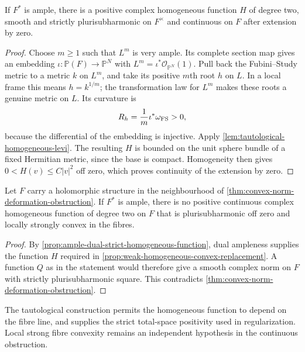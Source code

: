 \begin{proposition}\label{prop:ample-dual-strict-homogeneous-function}
If $F^*$ is ample, there is a positive complex homogeneous function $H$ of degree two, smooth and strictly plurisubharmonic on $F^\times$ and continuous on $F$ after extension by zero.
\end{proposition}
\begin{proof}
Choose $m\geq1$ such that $L^m$ is very ample. Its complete section map gives an embedding $\iota:\mathbb P(F)\to\mathbb P^N$ with $L^m=\iota^*\mathcal O_{\mathbb P^N}(1)$. Pull back the Fubini--Study metric to a metric $k$ on $L^m$, and take its positive $m$th root $h$ on $L$. In a local frame this means $h=k^{1/m}$; the transformation law for $L^m$ makes these roots a genuine metric on $L$. Its curvature is
\[
 R_h=\frac1m\iota^*\omega_{\rm FS}>0,
\]
because the differential of the embedding is injective. Apply \cref{lem:tautological-homogeneous-levi}. The resulting $H$ is bounded on the unit sphere bundle of a fixed Hermitian metric, since the base is compact. Homogeneity then gives $0<H(v)\leq C|v|^2$ off zero, which proves continuity of the extension by zero.
\end{proof}

\begin{corollary}\label{cor:ample-dual-continuous-convex-obstruction}
Let $F$ carry a holomorphic structure in the neighbourhood of \cref{thm:convex-norm-deformation-obstruction}. If $F^*$ is ample, there is no positive continuous complex homogeneous function of degree two on $F$ that is plurisubharmonic off zero and locally strongly convex in the fibres.
\end{corollary}
\begin{proof}
By \cref{prop:ample-dual-strict-homogeneous-function}, dual ampleness supplies the function $H$ required in \cref{prop:weak-homogeneous-convex-replacement}. A function $Q$ as in the statement would therefore give a smooth complex norm on $F$ with strictly plurisubharmonic square. This contradicts \cref{thm:convex-norm-deformation-obstruction}.
\end{proof}

The tautological construction permits the homogeneous function to depend on the fibre line, and supplies the strict total-space positivity used in regularization. Local strong fibre convexity remains an independent hypothesis in the continuous obstruction.
